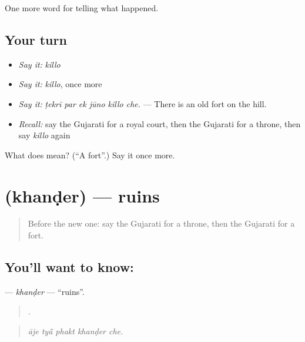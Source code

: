 \begin{grammarlens}[title={What you've built}]
One more word for telling what happened.
\end{grammarlens}

\subsection*{Your turn}
\begin{itemize}
\raggedright
  \item \emph{Say it:} \emph{killo}
  \item \emph{Say it:} \emph{killo}, once more
  \item \emph{Say it:} \emph{ṭekrī par ek jūno killo che.} — There is an old fort on the hill.
  \item \emph{Recall:} say the Gujarati for a royal court, then the Gujarati for a throne, then say \emph{killo} again
\end{itemize}

\begin{tcolorbox}[breakable,colback=teal!4,colframe=teal!35!black,title={Before you move on}]
What does  mean? (\textquotedblleft{}A fort\textquotedblright{}.) Say it once more.
\end{tcolorbox}
\section[\texorpdfstring{\gu{ખંડેર} (khanḍer)}{ખંડેર (khanḍer)}]{ (khanḍer) — ruins}

\label{lesson:GU-C319-khander}



\begin{quote}
Before the new one: say the Gujarati for a throne, then the Gujarati for a fort.
\end{quote}

\subsection*{You'll want to know: }
\textbf{} — \emph{khanḍer} — \textquotedblleft{}ruins\textquotedblright{}.

\begin{quote}
    .
\end{quote}

\begin{quote}
\emph{āje tyā̃ phakt khanḍer che.}
\end{quote}

